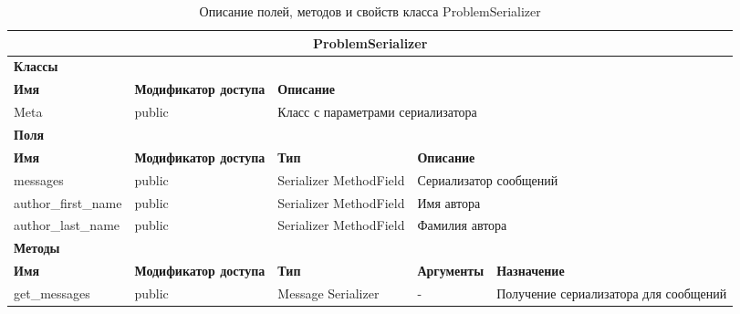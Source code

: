 \documentclass{../includes/TechDoc}
\begin{document}
    \begin{table}[ht]
        \caption{\label{tab:class-ProblemSerializer-table}Описание полей, методов и свойств класса ProblemSerializer}
        \centering
        \begin{tabular}{|p{3.2cm}|p{3cm}|p{2.9cm}|p{2.9cm}|p{4cm}|}
            \hline
            \multicolumn{5}{|c|}{ProblemSerializer} \\ \hline
            \multicolumn{5}{|l|}{\textbf{Классы}} \\ \hline
            \textbf{Имя} & \textbf{Модификатор доступа} & \multicolumn{3}{p{9.8cm}|}{\textbf{Описание}} \\ \hline
            Meta & public & \multicolumn{3}{p{9.8cm}|}{Класс с параметрами сериализатора} \\ \hline
            \multicolumn{5}{|l|}{\textbf{Поля}} \\ \hline
            \textbf{Имя} & \textbf{Модификатор доступа} & \textbf{Тип} & \multicolumn{2}{p{6.9cm}|}{\textbf{Описание}} \\ \hline
            messages & public & Serializer MethodField & \multicolumn{2}{p{6.9cm}|}{Сериализатор сообщений} \\ \hline
            author_first_name & public & Serializer MethodField & \multicolumn{2}{p{6.9cm}|}{Имя автора} \\ \hline
            author_last_name & public & Serializer MethodField & \multicolumn{2}{p{6.9cm}|}{Фамилия автора} \\ \hline
            \multicolumn{5}{|l|}{\textbf{Методы}} \\ \hline
            \textbf{Имя} & \textbf{Модификатор доступа} & \textbf{Тип} & \textbf{Аргументы} & \textbf{Назначение} \\ \hline
            get\_messages & public & Message Serializer & - & Получение сериализатора для сообщений \\ \hline
        \end{tabular}
    \end{table}
\end{document}
